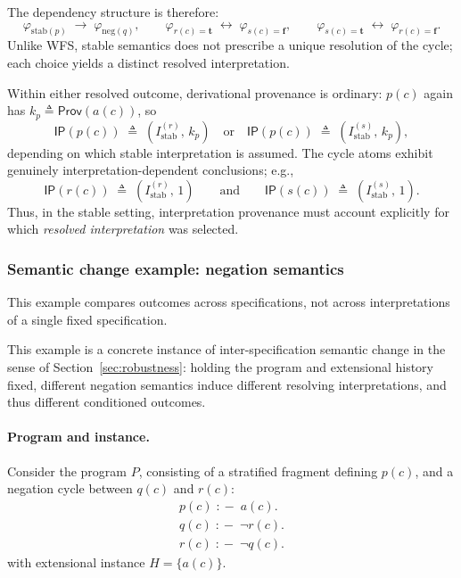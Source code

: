 \documentclass[acmsmall,nonacm]{acmart}
\theoremstyle{remark}
\numberwithin{definition}{section}
\numberwithin{theorem}{section}
\numberwithin{lemma}{section}
\numberwithin{corollary}{section}
\numberwithin{remark}{section}
\numberwithin{example}{section}
\numberwithin{observation}{section}
\numberwithin{assumption}{section}
\newcommand{\drule}{\mathrel{:\!-}}
\newcommand{\Prov}{\mathsf{Prov}}
\begin{document}
The dependency structure is therefore:
\[
  \varphi_{\mathrm{stab}(p)} \;\rightarrow\; \varphi_{\mathrm{neg}(q)},
  \qquad
  \varphi_{r(c)=\mathbf{t}} \;\leftrightarrow\; \varphi_{s(c)=\mathbf{f}},
  \qquad
  \varphi_{s(c)=\mathbf{t}} \;\leftrightarrow\; \varphi_{r(c)=\mathbf{f}} .
\]
Unlike WFS, stable semantics does not prescribe a unique resolution of the cycle;
each choice yields a distinct resolved interpretation.

Within either resolved outcome, derivational provenance is ordinary:
$p(c)$ again has $k_p \triangleq \Prov(a(c))$, so
\[
  \mathsf{IP}(p(c)) \;\triangleq\; (I_{\mathrm{stab}}^{(r)},\, k_p)
  \quad\text{or}\quad
  \mathsf{IP}(p(c)) \;\triangleq\; (I_{\mathrm{stab}}^{(s)},\, k_p) ,
\]
depending on which stable interpretation is assumed.
The cycle atoms exhibit genuinely interpretation-dependent conclusions; e.g.,
\[
  \mathsf{IP}(r(c)) \;\triangleq\; (I_{\mathrm{stab}}^{(r)},\, 1)
  \qquad\text{and}\qquad
  \mathsf{IP}(s(c)) \;\triangleq\; (I_{\mathrm{stab}}^{(s)},\, 1) .
\]
Thus, in the stable setting, interpretation provenance must account explicitly for
which \emph{resolved interpretation} was selected.

\subsubsection{Semantic change example: negation semantics}

This example compares outcomes across specifications, not across interpretations of a single fixed specification.

This example is a concrete instance of inter-specification semantic change in the sense of
Section~\ref{sec:robustness}: holding the program and extensional history fixed,
different negation semantics induce different resolving interpretations, and thus
different conditioned outcomes.

\paragraph{Program and instance.}
Consider the program $P$, consisting of a stratified fragment defining $p(c)$,
and a negation cycle between $q(c)$ and $r(c)$:
\[
\begin{array}{l}
p(c) \;\drule\; a(c).\\
q(c) \;\drule\; \neg r(c).\\
r(c) \;\drule\; \neg q(c).
\end{array}
\]
with extensional instance $H = \{a(c)\}$.
\end{document}

